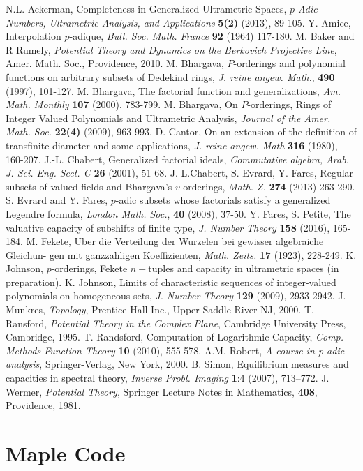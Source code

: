 \documentclass[12pt, glossary]{dalthesis}
\theoremstyle{plain}
\theoremstyle{definition}
\begin{document}
\begin{thebibliography}{9}
 N.L. Ackerman, Completeness in Generalized Ultrametric Spaces, \textit{$p$-Adic Numbers, Ultrametric Analysis, and Applications} \textbf{5(2)} (2013), 89-105.
 Y. Amice, Interpolation $p$-adique, \textit{Bull. Soc. Math. France} \textbf{92} (1964) 117-180.
 M. Baker and R Rumely, \textit{Potential Theory and Dynamics on the Berkovich
Projective Line}, Amer. Math. Soc., Providence, 2010.
 M. Bhargava, $P$-orderings and polynomial functions on arbitrary subsets of Dedekind
rings, \textit{J. reine angew. Math.}, \textbf{490} (1997), 101-127.
 M. Bhargava, The factorial function and generalizations, \textit{Am. Math. Monthly}
\textbf{107} (2000), 783-799.
 M. Bhargava, On $P$-orderings, Rings of Integer Valued Polynomials and Ultrametric
Analysis, \textit{Journal of the Amer. Math. Soc.} \textbf{22(4)} (2009), 963-993.
  D. Cantor, On an extension of the definition of transfinite diameter and some applications, \textit{J. reine angew. Math} \textbf{316} (1980), 160-207.  
 J.-L. Chabert, Generalized factorial ideals, \textit{Commutative algebra, Arab. J. Sci. Eng.
Sect. C} \textbf{26} (2001), 51-68.
 J.-L.Chabert, S. Evrard, Y. Fares, Regular subsets of valued fields and Bhargava’s $v$-orderings, \textit{Math. Z.} \textbf{274} (2013) 263-290.
 S. Evrard and Y. Fares, $p$-adic subsets whose factorials satisfy a generalized Legendre
formula, \textit{London Math. Soc.}, \textbf{40} (2008), 37-50.
 Y. Fares, S. Petite, The valuative capacity of subshifts of finite type, \textit{J. Number Theory} \textbf{158}
(2016), 165-184.
 M. Fekete, Uber die Verteilung der Wurzelen bei gewisser algebraiche Gleichun-
gen mit ganzzahligen Koeffizienten, \textit{Math. Zeits.} \textbf{17} (1923), 228-249.
 K. Johnson, $p$-orderings, Fekete $n-$tuples and capacity in ultrametric spaces (in preparation).
 K. Johnson, Limits of characteristic sequences of integer-valued polynomials on
homogeneous sets, \textit{J. Number Theory} \textbf{129} (2009), 2933-2942.
 J. Munkres, \textit{Topology}, Prentice Hall Inc., Upper Saddle River NJ, 2000.
 T. Ransford, \textit{Potential Theory in the Complex Plane}, Cambridge University Press, Cambridge, 1995.
 T. Randsford, Computation of Logarithmic Capacity, \textit{Comp. Methods Function Theory} \textbf{10} (2010), 555-578.
 A.M. Robert, \textit{A course in p-adic analysis}, Springer-Verlag, New York, 2000.
 B. Simon, Equilibrium measures and capacities in spectral theory, \textit{Inverse Probl. Imaging} \textbf{1}:4 (2007), 713–772. 
 J. Wermer, \textit{Potential Theory}, Springer Lecture Notes in Mathematics, \textbf{408}, Providence, 1981.
\end{thebibliography}

\appendix
\chapter{Maple Code}
	
\end{document}
